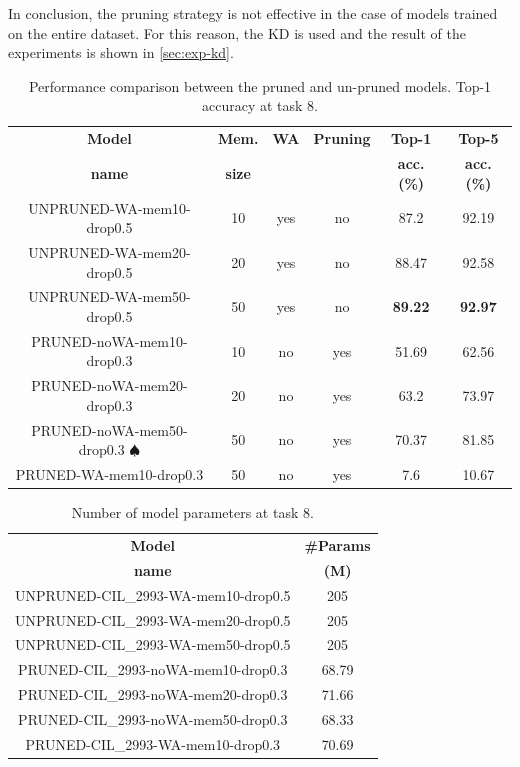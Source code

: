 In conclusion, the pruning strategy is not effective in the case of models trained on the entire dataset. For this reason, the KD is used and the result of the experiments is shown in \autoref{sec:exp-kd}.

\begin{table}[H]
    \centering
    \begin{tabular}{c|c|c|c|c|c}
        \hline
        \textbf{Model} &
        \textbf{Mem.} &
        \textbf{WA} &
        \textbf{Pruning} &
        \textbf{Top-1} & 
        \textbf{Top-5} \\
        \textbf{name} &
        \textbf{size} &
        &
        &
        \textbf{acc. (\%)} & 
        \textbf{acc. (\%)} \\
        \hline
        \hline
UNPRUNED-WA-mem10-drop0.5&10&yes&no&87.2&92.19\\
UNPRUNED-WA-mem20-drop0.5&20&yes&no&88.47&92.58\\
UNPRUNED-WA-mem50-drop0.5&50&yes&no&\textbf{89.22}&\textbf{92.97}\\
\hline
PRUNED-noWA-mem10-drop0.3&10&no&yes&51.69&62.56\\
PRUNED-noWA-mem20-drop0.3&20&no&yes&63.2&73.97\\
PRUNED-noWA-mem50-drop0.3 $\spadesuit$&50&no&yes&70.37&81.85\\
\hline
PRUNED-WA-mem10-drop0.3&50&no&yes&7.6&10.67\\
\hline
\end{tabular}
\caption{Performance comparison between the pruned and un-pruned models. Top-1 accuracy at task 8.}
    \label{table:exp7}
\end{table}


\begin{table}[H]
    \centering
    \begin{tabular}{c|c}
        \hline
        \textbf{Model} &
        \textbf{\#Params} \\
        \textbf{name} &
        \textbf{(M)} \\
        \hline
        \hline
UNPRUNED-CIL\_2993-WA-mem10-drop0.5&205\\
UNPRUNED-CIL\_2993-WA-mem20-drop0.5&205\\
UNPRUNED-CIL\_2993-WA-mem50-drop0.5&205\\
\hline
PRUNED-CIL\_2993-noWA-mem10-drop0.3&68.79\\
PRUNED-CIL\_2993-noWA-mem20-drop0.3&71.66\\
PRUNED-CIL\_2993-noWA-mem50-drop0.3&68.33\\
\hline
PRUNED-CIL\_2993-WA-mem10-drop0.3&70.69\\
        \hline
    \end{tabular}
	\caption{Number of model parameters at task 8.}%
    \label{table:exp7-params}
\end{table}

